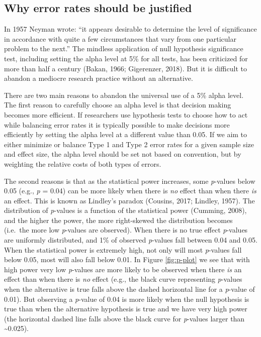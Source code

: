 \documentclass[,jou,floatsintext]{apa6}
\begin{document}
\hypertarget{why-error-rates-should-be-justified}{%
\subsection{Why error rates should be justified}\label{why-error-rates-should-be-justified}}

In 1957 Neyman wrote: \enquote{it appears desirable to determine the level of significance in accordance with quite a few circumstances that vary from one particular problem to the next.} The mindless application of null hypothesis significance test, including setting the alpha level at 5\% for all tests, has been criticized for more than half a century (Bakan, 1966; Gigerenzer, 2018). But it is difficult to abandon a mediocre research practice without an alternative.

There are two main reasons to abandon the universal use of a 5\% alpha level. The first reason to carefully choose an alpha level is that decision making becomes more efficient. If researchers use hypothesis tests to choose how to act while balancing error rates it is typically possible to make decisions more efficiently by setting the alpha level at a different value than 0.05. If we aim to either minimize or balance Type 1 and Type 2 error rates for a given sample size and effect size, the alpha level should be set not based on convention, but by weighting the relative costs of both types of errors.

The second reasons is that as the statistical power increases, some \emph{p}-values below 0.05 (e.g., \emph{p} = 0.04) can be more likely when there is \emph{no} effect than when there \emph{is} an effect. This is known as Lindley's paradox (Cousins, 2017; Lindley, 1957). The distribution of \emph{p}-values is a function of the statistical power (Cumming, 2008), and the higher the power, the more right-skewed the distribution becomes (i.e.~the more low \emph{p}-values are observed). When there is no true effect \emph{p}-values are uniformly distributed, and 1\% of observed \emph{p}-values fall between 0.04 and 0.05. When the statistical power is extremely high, not only will most \emph{p}-values fall below 0.05, most will also fall below 0.01. In Figure \ref{fig:p-plot} we see that with high power very low \emph{p}-values are more likely to be observed when there \emph{is} an effect than when there is \emph{no} effect (e.g., the black curve representing \emph{p}-values when the alternative is true falls above the dashed horizontal line for a \emph{p}-value of 0.01). But observing a \emph{p}-value of 0.04 is more likely when the null hypothesis is true than when the alternative hypothesis is true and we have very high power (the horizontal dashed line falls above the black curve for \emph{p}-values larger than \textasciitilde0.025).
\end{document}
